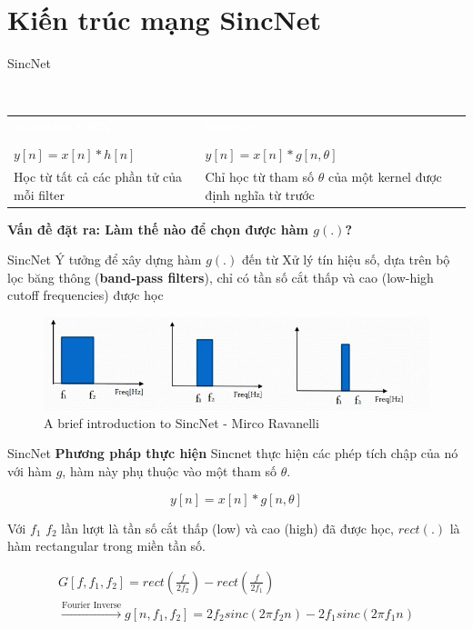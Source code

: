 \documentclass[notheorems, aspectratio=54]{beamer}
\begin{document}
\section{Kiến trúc mạng SincNet}
\begin{frame}{SincNet}
	\begin{block}{~\vspace{0.7cm}}
		\begin{center}
			\vspace{-0.8cm}
			\begin{tabular}{p{0.45\textwidth}|p{}}
				\textcolor{white}{\bf Standard CNN} & \textcolor{white}{\bf SincNet} \\\\
				 $y[n] = x[n] * h[n]$ & $y[n] = x[n] * g[n, \theta]$\\
				 Học từ tất cả các phần tử của mỗi filter & Chỉ học từ tham số $\theta$ của một kernel được định nghĩa từ trước\\
			\end{tabular}
		\end{center}
	\end{block}
	\textbf{Vấn đề đặt ra: Làm thế nào để chọn được hàm $g(.)$?}
\end{frame}
\begin{frame}{SincNet}
	Ý tưởng để xây dựng hàm $g(.)$ đến từ Xử lý tín hiệu số, dựa trên bộ lọc băng thông (\textbf{band-pass filters}), chỉ có tần số cắt thấp và cao (low-high cutoff frequencies) được học
	\begin{figure}[H]
		\includegraphics[width=0.9\linewidth]{images/band_passfilters.png}
		\caption{A brief introduction to SincNet - Mirco Ravanelli}
		\label{fig:writing-thesis}
	\end{figure}
\end{frame}
\begin{frame}{SincNet}
	\textbf{Phương pháp thực hiện} Sincnet thực hiện các phép tích chập của nó với hàm $g$, hàm này phụ thuộc vào một tham số $\theta$.
	
	$$y[n] = x[n] * g[n, \theta]$$
	
	Với $f_1$ $f_2$ lần lượt là tần số cắt thấp (low) và cao (high) đã được học, $rect(.)$ là hàm rectangular trong miền tần số.
	
	\begin{gather*}
	G[f, f_1, f_2] = rect\left(\frac{f}{2f_2}\right) -  rect\left(\frac{f}{2f_1}\right)\\ \xrightarrow{\text{Fourier Inverse}}g[n, f_1, f_2] = 2f_2sinc(2\pi f_2 n) - 2f_1sinc(2\pi f_1 n)
	\end{gather*}
\end{frame}
\end{document}
